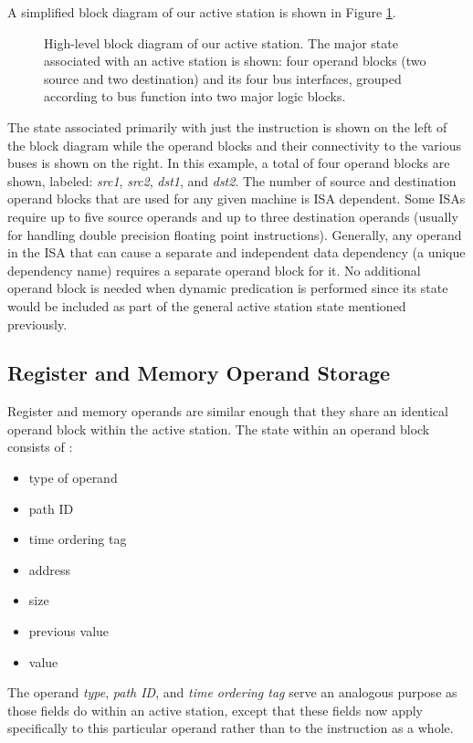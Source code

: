 \documentclass{book}
\begin{document}
A simplified block diagram of our active station is shown in 
Figure \ref{fig:issuestation}.
%
%
\begin{figure}
\centerline{}
\caption[High-level block diagram of our active station.]
{{High-level block diagram of our active station.}
The major state associated with an active station is shown:
four operand blocks (two source and two destination)
and its four bus interfaces, grouped
according to bus function into two major logic blocks.}
\label{fig:issuestation}
\end{figure}
%
%
The state associated primarily with just the instruction is
shown on the left of the block diagram while the operand blocks
and their connectivity to the various buses is shown on the
right.  
In this example, a total of four operand blocks are shown, labeled:
\textit{src1}, 
\textit{src2}, 
\textit{dst1}, 
and \textit{dst2}.
The number of source and destination operand blocks that are
used for any given machine is ISA dependent.
Some ISAs require up to five source operands and up to three destination
operands (usually for handling double precision floating point 
instructions).
Generally, any operand in the ISA that can cause a separate
and independent data dependency (a unique dependency name)
requires a separate operand block for it.
No additional operand block is needed when dynamic predication
is performed since its state would be included as
part of the general active station state mentioned previously.
%
%
\subsection{Register and Memory Operand Storage}
%
Register and memory operands are similar enough that
they share an identical operand block within the active station.
The state within an operand block consists of :
%
\begin{itemize}
\vspace{-0.10in}
\item{type of operand}
\vspace{-0.10in}
\item{path ID}
\vspace{-0.10in}
\item{time ordering tag}
\vspace{-0.10in}
\item{address}
\vspace{-0.10in}
\item{size}
\vspace{-0.10in}
\item{previous value}
\vspace{-0.10in}
\item{value}
\vspace{-0.10in}
\end{itemize}   
%
The operand \textit{type}, \textit{path ID}, and \textit{time ordering tag}
serve
an analogous purpose as those fields do within an active station,
except that these fields now apply specifically to this particular
operand rather than to the instruction as a whole.
\end{document}
